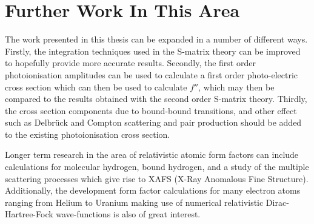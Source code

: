 \section{Further Work In This Area}
    The work presented in this thesis can be expanded in a number of different
    ways. Firstly, the integration techniques used in the S-matrix theory can
    be improved to hopefully provide more accurate results.
    Secondly, the first order photoionisation amplitudes can be used
    to calculate a first order photo-electric cross section which 
    can then be used to calculate $f''$, which may then be compared
    to the results obtained with the second order S-matrix theory.
    Thirdly, the cross section components due to bound-bound transitions,
    and other effect such as Delbr\"uck and Compton scattering and pair
    production should be added to the existing photoionisation 
    cross section.

    Longer term research in the area of relativistic atomic form factors
    can include calculations for molecular hydrogen, bound hydrogen, and a study
    of the multiple scattering processes which give rise to XAFS (X-Ray
    Anomalous Fine Structure).
    Additionally, the development form factor calculations for many electron
    atoms ranging from Helium to Uranium making use of numerical 
    relativistic Dirac-Hartree-Fock wave-functions is also of great interest.


